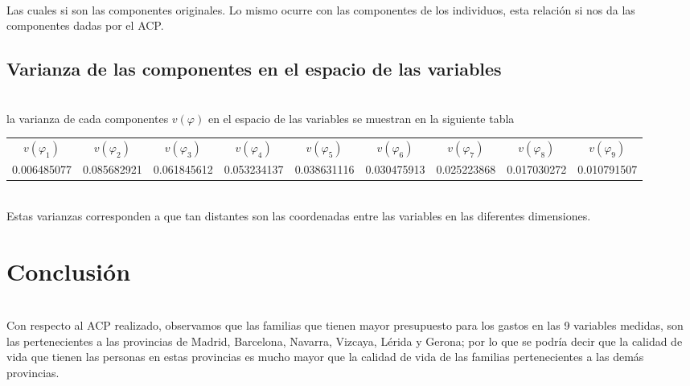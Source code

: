 \documentclass[report,oneside]{revcoles}
\begin{document}
~\\Las cuales si son las componentes originales. Lo mismo ocurre con las componentes de los individuos, esta relación si nos da las componentes dadas por el ACP.

\subsection{Varianza de las componentes en el espacio de las variables}
~\\la varianza de cada componentes $v(\varphi)$ en el espacio de las variables se muestran en la siguiente tabla
\begin{center}
\resizebox{17cm}{!} {
\begin{tabular}{|ccccccccc|}
\hline 
$v(\varphi_1)$ & $v(\varphi_2)$ & $v(\varphi_3)$ & $v(\varphi_4)$ & $v(\varphi_5)$ & $v(\varphi_6)$ & $v(\varphi_7)$ & $v(\varphi_8)$ & $v(\varphi_9)$ \\ 
0.006485077 & 0.085682921 & 0.061845612 & 0.053234137 & 0.038631116 & 0.030475913 & 0.025223868 & 0.017030272 & 0.010791507 \\ 
\hline 
\end{tabular} 
}
\end{center}
~\\Estas varianzas corresponden a que tan distantes son las coordenadas entre las variables en las diferentes dimensiones. 

\section{Conclusión}
~\\Con respecto al ACP realizado, observamos que las familias que tienen mayor presupuesto para los gastos en las 9 variables medidas, son las pertenecientes a las provincias de Madrid, Barcelona, Navarra, Vizcaya, Lérida y Gerona; por lo que se podría decir que la calidad de vida que tienen las personas en estas provincias es mucho mayor que la calidad de vida de las familias pertenecientes a las demás provincias.





    \appendix%


\end{document}
